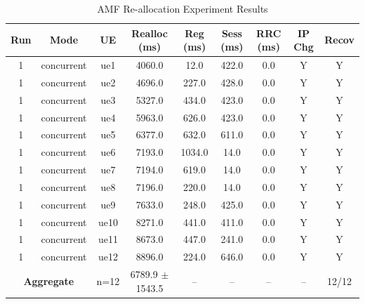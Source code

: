 \begin{table}[ht]
\centering
\begin{tabular}{|c|c|c|c|c|c|c|c|c|}
\hline
Run & Mode & UE & Realloc (ms) & Reg (ms) & Sess (ms) & RRC (ms) & IP Chg & Recov \\
\hline
1 & concurrent & ue1 & 4060.0 & 12.0 & 422.0 & 0.0 & Y & Y \\
1 & concurrent & ue2 & 4696.0 & 227.0 & 428.0 & 0.0 & Y & Y \\
1 & concurrent & ue3 & 5327.0 & 434.0 & 423.0 & 0.0 & Y & Y \\
1 & concurrent & ue4 & 5963.0 & 626.0 & 423.0 & 0.0 & Y & Y \\
1 & concurrent & ue5 & 6377.0 & 632.0 & 611.0 & 0.0 & Y & Y \\
1 & concurrent & ue6 & 7193.0 & 1034.0 & 14.0 & 0.0 & Y & Y \\
1 & concurrent & ue7 & 7194.0 & 619.0 & 14.0 & 0.0 & Y & Y \\
1 & concurrent & ue8 & 7196.0 & 220.0 & 14.0 & 0.0 & Y & Y \\
1 & concurrent & ue9 & 7633.0 & 248.0 & 425.0 & 0.0 & Y & Y \\
1 & concurrent & ue10 & 8271.0 & 441.0 & 411.0 & 0.0 & Y & Y \\
1 & concurrent & ue11 & 8673.0 & 447.0 & 241.0 & 0.0 & Y & Y \\
1 & concurrent & ue12 & 8896.0 & 224.0 & 646.0 & 0.0 & Y & Y \\
\multicolumn{2}{|c|}{\textbf{Aggregate}} & n=12 & 6789.9 $\pm$ 1543.5 & -- & -- & -- & -- & 12/12 \\
\hline
\end{tabular}
\caption{AMF Re-allocation Experiment Results}
\label{tab:amf_realloc}
\end{table}
